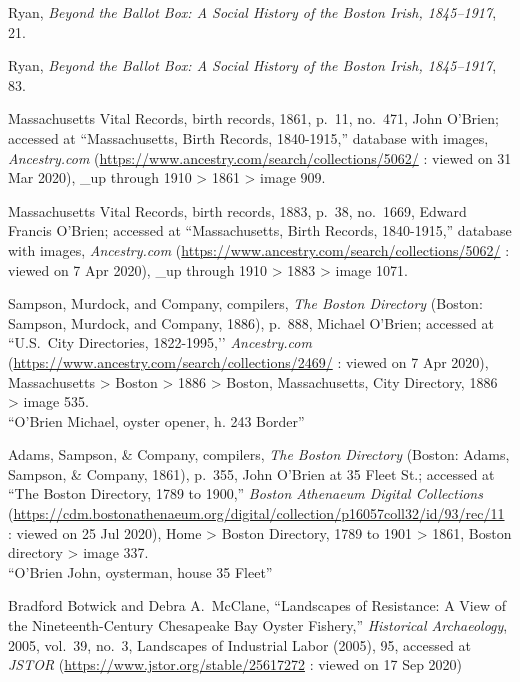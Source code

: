 \begin{thebibliography}{999}
Ryan, \textit{Beyond the Ballot Box: A Social History of the Boston Irish, 1845--1917}, 21.

Ryan, \textit{Beyond the Ballot Box: A Social History of the Boston Irish, 1845--1917}, 83.

Massachusetts Vital Records, birth records, 1861, p.\ 11, no.\ 471, John O'Brien; accessed at ``Massachusetts, Birth Records, 1840-1915,'' database with images, \textit{Ancestry.com} (\url{https://www.ancestry.com/search/collections/5062/} : viewed on 31 Mar 2020), \_up through 1910 > 1861 > image 909.

Massachusetts Vital Records, birth records, 1883, p.\ 38, no.\ 1669, Edward Francis O'Brien; accessed at ``Massachusetts, Birth Records, 1840-1915,'' database with images, \textit{Ancestry.com} (\url{https://www.ancestry.com/search/collections/5062/} : viewed on 7 Apr 2020), \_up through 1910 > 1883 > image 1071.

Sampson, Murdock, and Company, compilers, \textit{The Boston Directory} (Boston: Sampson, Murdock, and Company, 1886), p.\ 888, Michael O'Brien; accessed at ``U.S.\ City Directories, 1822-1995,’’ \textit{Ancestry.com} (\url{https://www.ancestry.com/search/collections/2469/} : viewed on 7 Apr 2020), Massachusetts > Boston > 1886 > Boston, Massachusetts, City Directory, 1886 > image 535.\\
``O'Brien Michael, oyster opener, h. 243 Border''

Adams, Sampson, \& Company, compilers, \textit{The Boston Directory} (Boston: Adams, Sampson, \& Company, 1861), p.\ 355, John O'Brien at 35 Fleet St.; accessed at ``The Boston Directory, 1789 to 1900,'' \textit{Boston Athenaeum Digital Collections} (\url{https://cdm.bostonathenaeum.org/digital/collection/p16057coll32/id/93/rec/11} : viewed on 25 Jul 2020), Home > Boston Directory, 1789 to 1901 > 1861, Boston directory > image 337.\\
``O'Brien John, oysterman, house 35 Fleet''

Bradford Botwick and Debra A.\ McClane, ``Landscapes of Resistance: A View of the Nineteenth-Century Chesapeake Bay Oyster Fishery,''  \textit{Historical Archaeology}, 2005, vol.\ 39, no.\ 3, Landscapes of Industrial Labor (2005), 95, accessed at \textit{JSTOR} (\url{https://www.jstor.org/stable/25617272} : viewed on 17 Sep 2020)


\end{thebibliography}
